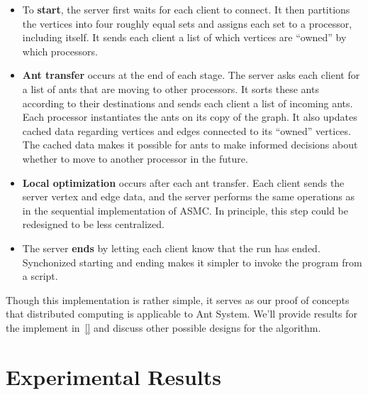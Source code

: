 \documentclass[11pt]{article}
\begin{document}
\begin{itemize}

\item To {\bf start}, the server first waits for each client to connect.  It
then partitions the vertices into four roughly equal sets and assigns each set
to a processor, including itself.  It sends each client a list of which
vertices are ``owned'' by which processors.

\item {\bf Ant transfer} occurs at the end of each stage.  The server asks
each client for a list of ants that are moving to other processors.  It sorts
these ants according to their destinations and sends each client a list of
incoming ants.  Each processor instantiates the ants on its copy of the graph.
It also updates cached data regarding vertices and edges connected to its
``owned'' vertices.  The cached data makes it possible for ants to make
informed decisions about whether to move to another processor in the future.

\item {\bf Local optimization} occurs after each ant transfer.  Each client
sends the server vertex and edge data, and the server performs the same
operations as in the sequential implementation of ASMC.  In principle, this
step could be redesigned to be less centralized.

\item The server {\bf ends} by letting each client know that the run has
ended.  Synchonized starting and ending makes it simpler to invoke the program
from a script.

\end{itemize}





Though this implementation is rather simple, it serves as our proof of concepts that distributed computing is applicable to Ant System.  We'll provide results for the implement in~\ref{} and discuss other possible designs for the algorithm.



\section{Experimental Results}\label{results} %
\end{document}
